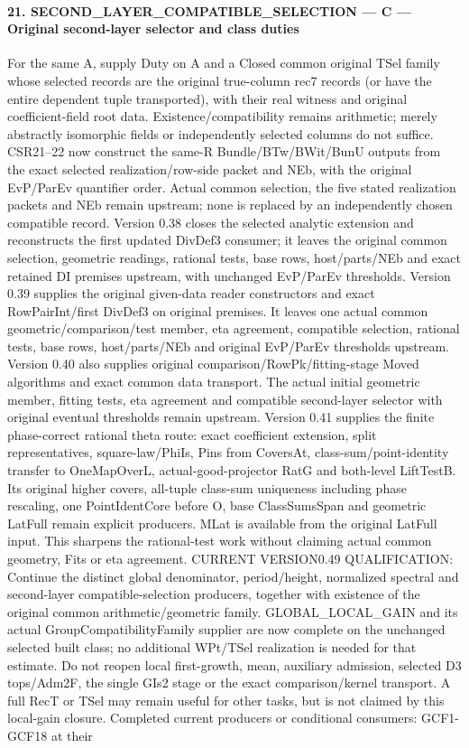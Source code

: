 \documentclass[11pt,a4paper]{article}
\numberwithin{equation}{section}
\theoremstyle{remark}\newtheorem{remark}[theorem]{Remark}
\begin{document}
\paragraph{21. SECOND\_\allowbreak LAYER\_\allowbreak COMPATIBLE\_\allowbreak SELECTION — C — Original second-layer selector and class duties}

For the same A, supply Duty on A and a Closed common original TSel family whose selected records are the original true-column rec7 records (or have the entire dependent tuple transported), with their real witness and original coefficient-field root data. Existence/compatibility remains arithmetic; merely abstractly isomorphic fields or independently selected columns do not suffice. CSR21–22 now construct the same-R Bundle/BTw/BWit/BunU outputs from the exact selected realization/row-side packet and NEb, with the original EvP/ParEv quantifier order. Actual common selection, the five stated realization packets and NEb remain upstream; none is replaced by an independently chosen compatible record. Version 0.38 closes the selected analytic extension and reconstructs the first updated DivDef3 consumer; it leaves the original common selection, geometric readings, rational tests, base rows, host/parts/NEb and exact retained DI premises upstream, with unchanged EvP/ParEv thresholds. Version 0.39 supplies the original given-data reader constructors and exact RowPairInt/first DivDef3 on original premises. It leaves one actual common geometric/comparison/test member, eta agreement, compatible selection, rational tests, base rows, host/parts/NEb and original EvP/ParEv thresholds upstream. Version 0.40 also supplies original comparison/RowPk/fitting-stage Moved algorithms and exact common data transport. The actual initial geometric member, fitting tests, eta agreement and compatible second-layer selector with original eventual thresholds remain upstream. Version 0.41 supplies the finite phase-correct rational theta route: exact coefficient extension, split representatives, square-law/PhiIs, Pins from CoversAt, class-sum/point-identity transfer to OneMapOverL, actual-good-projector RatG and both-level LiftTestB. Its original higher covers, all-tuple class-sum uniqueness including phase rescaling, one PointIdentCore before O, base ClassSumsSpan and geometric LatFull remain explicit producers. MLat is available from the original LatFull input. This sharpens the rational-test work without claiming actual common geometry, Fits or eta agreement. CURRENT VERSION0.49 QUALIFICATION: Continue the distinct global denominator, period/height, normalized spectral and second-layer compatible-selection producers, together with existence of the original common arithmetic/geometric family. GLOBAL\_\allowbreak LOCAL\_\allowbreak GAIN and its actual GroupCompatibilityFamily supplier are now complete on the unchanged selected built class; no additional WPt/TSel realization is needed for that estimate. Do not reopen local first-growth, mean, auxiliary admission, selected D3 tops/Adm2F, the single GIs2 stage or the exact comparison/kernel transport. A full RecT or TSel may remain useful for other tasks, but is not claimed by this local-gain closure. Completed current producers or conditional consumers: GCF1-GCF18 at their 
\end{document}
